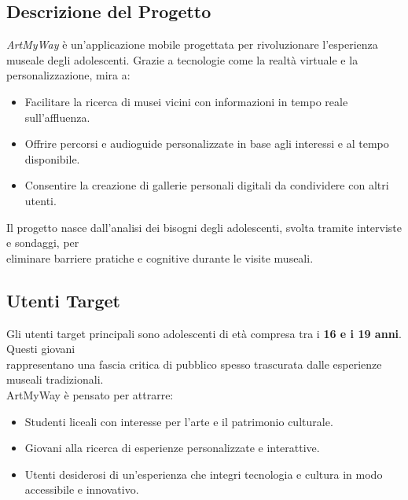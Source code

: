 \documentclass{article}
\begin{document}
\subsection{Descrizione del Progetto}
\textit{ArtMyWay} è un'applicazione mobile progettata per rivoluzionare l'esperienza museale degli adolescenti. Grazie a tecnologie come la realtà virtuale e la personalizzazione, mira a:
\begin{itemize}
\item Facilitare la ricerca di musei vicini con informazioni in tempo reale sull'affluenza.
\item Offrire percorsi e audioguide personalizzate in base agli interessi e al tempo disponibile.
\item Consentire la creazione di gallerie personali digitali da condividere con altri utenti.
\end{itemize}
Il progetto nasce dall'analisi dei bisogni degli adolescenti, svolta tramite interviste e sondaggi, per \\ eliminare barriere pratiche e cognitive durante le visite museali.

\subsection{Utenti Target}
Gli utenti target principali sono adolescenti di età compresa tra i \textbf{16 e i 19 anni}. Questi giovani \\ rappresentano una fascia critica di pubblico spesso trascurata dalle esperienze museali tradizionali. \\ ArtMyWay è pensato per attrarre:
\begin{itemize}
\item Studenti liceali con interesse per l'arte e il patrimonio culturale.
\item Giovani alla ricerca di esperienze personalizzate e interattive.
\item Utenti desiderosi di un'esperienza che integri tecnologia e cultura in modo accessibile e innovativo.

\end{itemize}
\end{document}
